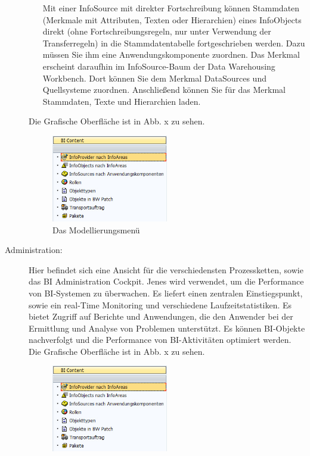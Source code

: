 \begin{description}
\begin{itemize}
Mit einer InfoSource mit direkter Fortschreibung können Stammdaten (Merkmale mit Attributen, Texten oder Hierarchien) eines InfoObjects direkt (ohne Fortschreibungsregeln, nur unter Verwendung der Transferregeln) in die Stammdatentabelle fortgeschrieben werden. Dazu müssen Sie ihm eine Anwendungskomponente zuordnen. Das Merkmal erscheint daraufhin im InfoSource-Baum der Data Warehousing Workbench. Dort können Sie dem Merkmal DataSources und Quellsysteme zuordnen. Anschließend können Sie für das Merkmal Stammdaten, Texte und Hierarchien laden.

\end{itemize}
Die Grafische Oberfläche ist in Abb. x zu sehen.
\begin{figure}[H]
    \centering
    \includegraphics[width=0.5\textwidth]{files/BIContent}
    \caption{Das Modellierungsmenü}
    \label{pic:DWOverview}
\end{figure}
\item[Administration:] Hier befindet sich eine Ansicht für die verschiedensten Prozessketten, sowie das BI Administration Cockpit. Jenes wird verwendet, um die Performance von BI-Systemen zu überwachen. Es liefert einen zentralen Einstiegspunkt, sowie ein real-Time Monitoring und verschiedene Laufzeitstatistiken. Es bietet Zugriff auf Berichte und Anwendungen, die den Anwender bei der Ermittlung und Analyse von Problemen unterstützt. Es können BI-Objekte nachverfolgt und die Performance von BI-Aktivitäten optimiert werden.
Die Grafische Oberfläche ist in Abb. x zu sehen.
\begin{figure}[H]
    \centering
    \includegraphics[width=0.5\textwidth]{files/BIContent}

\end{figure}
\end{description}
